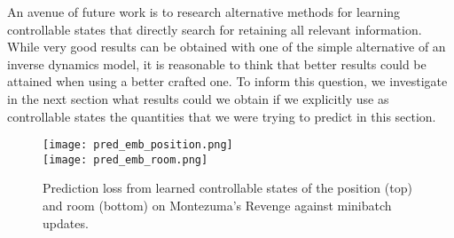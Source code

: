 \documentclass{article} \usepackage{iclr2020_conference,times}
\begin{document}
An avenue of future work is to research alternative methods for learning controllable states that directly search for retaining all relevant information. While very good results can be obtained with one of the simple alternative of an inverse dynamics model, it is reasonable to think that better results could be attained when using a better crafted one. To inform this question, we investigate in the next section what results could we obtain if we explicitly use as controllable states the quantities that we were trying to predict in this section.

\begin{figure}[!tbp]
    \centering
    \texttt{[image: pred\_emb\_position.png]}
    \\
    \texttt{[image: pred\_emb\_room.png]}
    \\
    \caption{Prediction loss from learned controllable states of the position (top) and room (bottom) on Montezuma's Revenge against minibatch updates.
}
    \label{predictability_results}
    \vspace{-1ex}
\end{figure}
\end{document}

